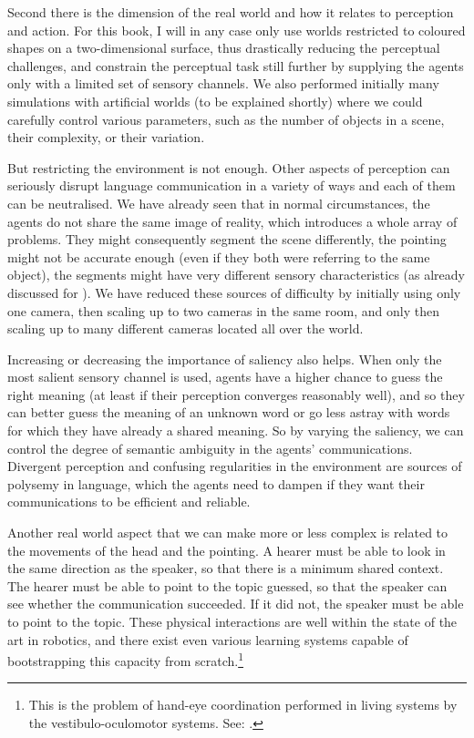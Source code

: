 Second there is the dimension of the real world and how it relates 
to perception and action.  For this book, I will in any
case only use worlds restricted to 
coloured shapes on a two-dimensional surface, thus drastically reducing
the perceptual challenges, and constrain the perceptual 
task still further by supplying the agents only with a 
limited set of sensory channels. We also performed
initially many simulations with artificial worlds (to
be explained shortly) where we could carefully control various 
parameters, such as the number of objects in a scene, their
complexity, or their variation. 

But restricting the environment 
is not enough. Other aspects of perception
can seriously disrupt language communication 
in a variety of ways and each of them can be neutralised. 
We have already seen that 
in normal circumstances, the agents 
do not share the same image of reality, which introduces 
a whole array of problems. They might consequently
segment the scene differently, the pointing might not be accurate enough
(even if they both were referring to the same object), 
the segments might have very different sensory characteristics 
(as already discussed for ). We have
reduced these sources of difficulty by initially using 
only one camera, then scaling up to two cameras
in the same room, and only then scaling up to many different cameras
located all over the world. 

Increasing or decreasing the importance 
of saliency also helps. When only the most salient sensory 
channel is used, agents have a higher chance to guess the 
right meaning (at least if their perception converges reasonably 
well), and so they can better guess the meaning of an unknown
word or go less astray with words for which they have already
a shared meaning. So by varying the saliency, we can control the 
degree of semantic ambiguity in the agents' communications. 
Divergent perception and confusing regularities in the
environment are sources of 
polysemy in language, which the agents need to 
dampen if they want their communications to be efficient and
reliable. 

Another real world aspect that we can make more or less
complex is related to the movements of the head and the pointing. 
A hearer must be able to look in the same direction as the 
speaker, so that there is a minimum shared context. The 
hearer must be able to point to the topic guessed, 
so that the speaker can see whether the communication 
succeeded. If it did not, the speaker must be able to point 
to the topic. These physical interactions are well within
the state of the art in robotics, and there exist even 
various learning systems capable of bootstrapping this capacity
from scratch.\footnote{
This is the problem of hand-eye coordination performed
in living systems by the vestibulo-oculomotor systems. 
See: \cite{Anastacio:1989}.}

